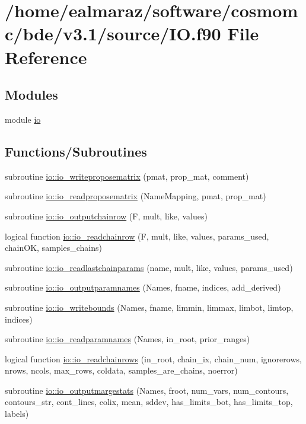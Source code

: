 \hypertarget{IO_8f90}{}\section{/home/ealmaraz/software/cosmomc/bde/v3.1/source/\+IO.f90 File Reference}
\label{IO_8f90}
\subsection*{Modules}
\begin{DoxyCompactItemize}
\item 
module \mbox{\hyperlink{namespaceio}{io}}
\end{DoxyCompactItemize}
\subsection*{Functions/\+Subroutines}
\begin{DoxyCompactItemize}
\item 
subroutine \mbox{\hyperlink{namespaceio_a66f16ed76a4e04dc87230befac8fb1cf}{io\+::io\+\_\+writeproposematrix}} (pmat, prop\+\_\+mat, comment)
\item 
subroutine \mbox{\hyperlink{namespaceio_a4734dc919ea1333d891f5bc59cedfc66}{io\+::io\+\_\+readproposematrix}} (Name\+Mapping, pmat, prop\+\_\+mat)
\item 
subroutine \mbox{\hyperlink{namespaceio_a304998b946633408764eeaf9b32b5687}{io\+::io\+\_\+outputchainrow}} (F, mult, like, values)
\item 
logical function \mbox{\hyperlink{namespaceio_a2ec9ab3b6936778533ec623b98d2b7b0}{io\+::io\+\_\+readchainrow}} (F, mult, like, values, params\+\_\+used, chain\+OK, samples\+\_\+chains)
\item 
subroutine \mbox{\hyperlink{namespaceio_a9de0b570ee4f35ba8e729e08cd26f7fe}{io\+::io\+\_\+readlastchainparams}} (name, mult, like, values, params\+\_\+used)
\item 
subroutine \mbox{\hyperlink{namespaceio_aa16f5fbf54e4430bea5bda0c8ab2f40e}{io\+::io\+\_\+outputparamnames}} (Names, fname, indices, add\+\_\+derived)
\item 
subroutine \mbox{\hyperlink{namespaceio_a767aeea14da167ae9027cac1b5b0a021}{io\+::io\+\_\+writebounds}} (Names, fname, limmin, limmax, limbot, limtop, indices)
\item 
subroutine \mbox{\hyperlink{namespaceio_a5bb562a4b599ac448a717abd04d9d856}{io\+::io\+\_\+readparamnames}} (Names, in\+\_\+root, prior\+\_\+ranges)
\item 
logical function \mbox{\hyperlink{namespaceio_af9199bcf411dd77ceb40961983436c41}{io\+::io\+\_\+readchainrows}} (in\+\_\+root, chain\+\_\+ix, chain\+\_\+num, ignorerows, nrows, ncols, max\+\_\+rows, coldata, samples\+\_\+are\+\_\+chains, noerror)
\item 
subroutine \mbox{\hyperlink{namespaceio_a4e9e0bbb9fe4d25b43fe615489cdf0a2}{io\+::io\+\_\+outputmargestats}} (Names, froot, num\+\_\+vars, num\+\_\+contours, contours\+\_\+str, cont\+\_\+lines, colix, mean, sddev, has\+\_\+limits\+\_\+bot, has\+\_\+limits\+\_\+top, labels)
\end{DoxyCompactItemize}
